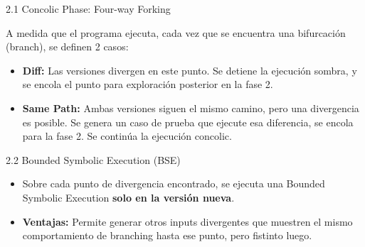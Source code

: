 \documentclass{beamer}
\begin{document}
\begin{frame}{2.1 Concolic Phase: Four-way Forking}
\centering
{}
\vspace{5pt}

\raggedright
A medida que el programa ejecuta, cada vez que se encuentra una bifurcación (branch), se definen 2 casos:
    \begin{itemize}
        \item \textbf{Diff:} Las versiones divergen en este punto. Se detiene la ejecución sombra, y se encola el punto para exploración posterior en la fase 2.
        \item \textbf{Same Path:} Ambas versiones siguen el mismo camino, pero una divergencia es posible. Se genera un caso de prueba que ejecute esa diferencia, se encola para la fase 2. Se continúa la ejecución concolic.
    \end{itemize}
\end{frame}

\begin{frame}{2.2 Bounded Symbolic Execution (BSE)}
\centering
{}
\begin{itemize}
    \item Sobre cada punto de divergencia encontrado, se ejecuta una Bounded Symbolic Execution \textbf{solo en la versión nueva}.
    \item \textbf{Ventajas:} Permite generar otros inputs divergentes que muestren el mismo comportamiento de branching hasta ese punto, pero fistinto luego. 
\end{itemize}
\end{frame}
\end{document}
